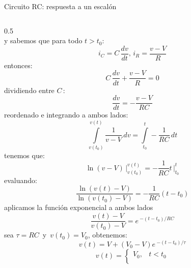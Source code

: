 \documentclass[aspectratio=169]{beamer}
\begin{document}
\begin{frame}{Circuito RC: respuesta a un escalón}
\begin{columns}[onlytextwidth]
\begin{column}{0.5\textwidth}
{{\begin{equation*}
            \end{equation*}
            }
            {y sabemos que para todo $t>t_0$: 
            \begin{equation*}
                i_C = C\,\dfrac{dv}{dt},\, i_R=\dfrac{v-V}{R}
            \end{equation*}
            }
            {entonces:
            \begin{equation*}
                C\,\dfrac{dv}{dt} + \dfrac{v-V}{R} = 0
            \end{equation*}
            }
        }
            {
            {dividiendo entre $C\,$:
            \begin{equation*}
                \dfrac{dv}{dt} = -\dfrac{v-V}{RC}
            \end{equation*}
            }
            {reordenado e integrando a ambos lados:
            \begin{equation*}
                \int\limits_{v(t_0)}^{v(t)}\dfrac{1}{v-V}\,dv = \int\limits_{t_0}^{t}-\frac{1}{RC}\,dt
            \end{equation*}
            }
        }
            {
            {tenemos que:
            \begin{equation*}
                \ln(v-V)\,\bigg|_{v(t_0)}^{v(t)} = -\frac{1}{RC}t\,\bigg|_{t_0}^{t}
            \end{equation*}
            }
            {evaluando:
            \begin{equation*}
                \dfrac{\ln(v(t)-V)}{\ln (v(t_0)-V)} = -\frac{1}{RC}(t - t_0)
            \end{equation*}
            }
        }
            {
            {aplicamos la función exponencial a ambos lados
            \begin{equation*}
                \dfrac{v(t)-V}{v(t_0)-V} = e\,^{-(t - t_0)/RC}
            \end{equation*}
            }
            {sea $\tau=RC\,$ y $\,v(t_0) = V_0$, obtenemos:
            \begin{equation*}
                v(t)=V + (V_0-V)e\,^{-(t - t_0)/ \tau}
            \end{equation*}
            }
        }
            {
            {\begin{equation*}
                v(t) =
                \begin{cases}
                    V_0, & t < t_0\\

\end{cases}
\end{equation*}}}
\end{column}
\end{columns}
\end{frame}
\end{document}
